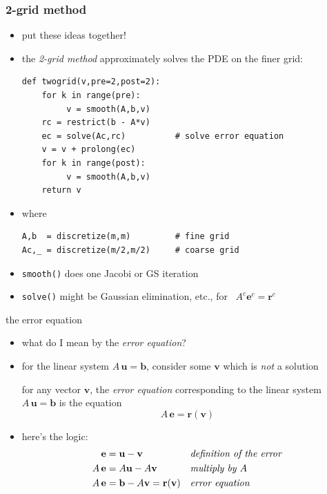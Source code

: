 \documentclass[10pt,
               svgnames,
               hyperref={colorlinks,citecolor=DeepPink4,linkcolor=FireBrick,urlcolor=Maroon},
               usepdftitle=false]{beamer}
\newcommand{\bb}{\mathbf{b}}
\newcommand{\be}{\mathbf{e}}
\newcommand{\br}{\mathbf{r}}
\newcommand{\bu}{\mathbf{u}}
\newcommand{\bv}{\mathbf{v}}
\begin{document}
\begin{frame}[fragile]
\frametitle{2-grid method}
\begin{itemize}
\item put these ideas together!
\item the \emph{2-grid method} approximately solves the PDE on the finer grid:

\bigskip
\begin{verbatim}
def twogrid(v,pre=2,post=2):
    for k in range(pre):
         v = smooth(A,b,v)
    rc = restrict(b - A*v)
    ec = solve(Ac,rc)          # solve error equation
    v = v + prolong(ec)
    for k in range(post):
         v = smooth(A,b,v)
    return v
\end{verbatim}

\medskip
\item where
\begin{verbatim}
A,b  = discretize(m,m)         # fine grid
Ac,_ = discretize(m/2,m/2)     # coarse grid
\end{verbatim}
\item \texttt{smooth()} does one Jacobi or GS iteration
\item \texttt{solve()} might be Gaussian elimination, etc., for \, $A^c \be^c = \br^c$
\end{itemize}
\end{frame}


\begin{frame}{the error equation}
\begin{itemize}
\item what do I mean by the \emph{error equation}?
\item for the linear system $A\,\bu=\bb$, consider some $\bv$ which is \emph{not} a solution

\begin{definition}
for any vector $\bv$, the \emph{error equation} corresponding to the linear system $A\,\bu = \bb$ is the equation
	$$A\,\be = \br(\bv)$$
\end{definition}

\item here's the logic:
\begin{align*}
    \be &= \bu - \bv                   &&\text{\emph{definition of the error}}\\
    A\, \be &= A \bu - A \bv           &&\text{\emph{multiply by $A$}}\\
    A\, \be &= \bb - A \bv = \br(\bv)  &&\text{\emph{error equation}}
\end{align*}
\end{itemize}
\end{frame}
\end{document}
